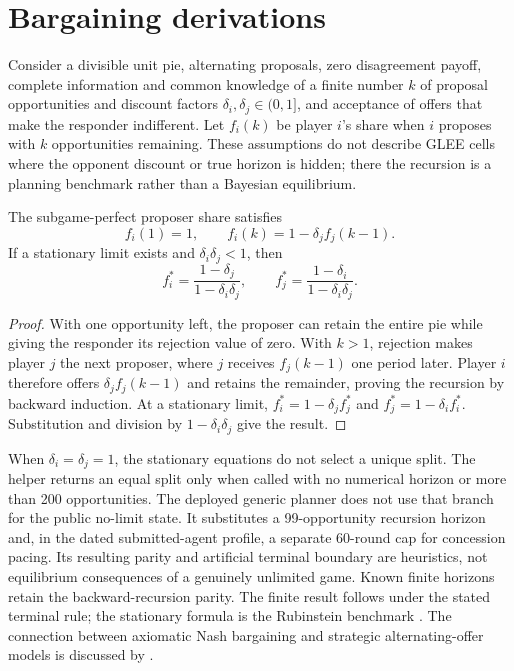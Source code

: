 \FloatBarrier
\section{Bargaining derivations}
\label{app:bargaining}

Consider a divisible unit pie, alternating proposals, zero disagreement payoff,
complete information and common knowledge of a finite number $k$ of proposal
opportunities and discount factors $\delta_i,\delta_j\in(0,1]$, and acceptance
of offers that make the responder indifferent. Let $f_i(k)$ be player $i$'s
share when $i$ proposes with $k$ opportunities remaining. These assumptions do
not describe GLEE cells where the opponent discount or true horizon is hidden;
there the recursion is a planning benchmark rather than a Bayesian equilibrium.

\begin{proposition}
The subgame-perfect proposer share satisfies
\begin{equation}
f_i(1)=1,\qquad f_i(k)=1-\delta_j f_j(k-1).
\label{eq:finite_recursion}
\end{equation}
If a stationary limit exists and $\delta_i\delta_j<1$, then
\begin{equation}
f_i^*=\frac{1-\delta_j}{1-\delta_i\delta_j},\qquad
f_j^*=\frac{1-\delta_i}{1-\delta_i\delta_j}.
\end{equation}
\end{proposition}
\begin{proof}
With one opportunity left, the proposer can retain the entire pie while giving
the responder its rejection value of zero. With $k>1$, rejection makes player
$j$ the next proposer, where $j$ receives $f_j(k-1)$ one period later. Player
$i$ therefore offers $\delta_j f_j(k-1)$ and retains the remainder, proving the
recursion by backward induction. At a stationary limit,
$f_i^*=1-\delta_j f_j^*$ and $f_j^*=1-\delta_i f_i^*$. Substitution and division
by $1-\delta_i\delta_j$ give the result.
\end{proof}

When $\delta_i=\delta_j=1$, the stationary equations do not select a unique
split. The helper returns an equal split only when called with no numerical
horizon or more than 200 opportunities. The deployed generic planner does not
use that branch for the public no-limit state. It substitutes a 99-opportunity
recursion horizon and, in the dated submitted-agent profile, a separate 60-round cap for
concession pacing. Its resulting parity and artificial terminal boundary are
heuristics, not equilibrium consequences of a genuinely unlimited game. Known
finite horizons retain the backward-recursion parity. The finite result follows
under the stated terminal rule; the stationary formula is the Rubinstein benchmark
\citep{rubinstein1982}. The connection between
axiomatic Nash bargaining and strategic alternating-offer models is discussed
by \citet{binmore1986nash}.

